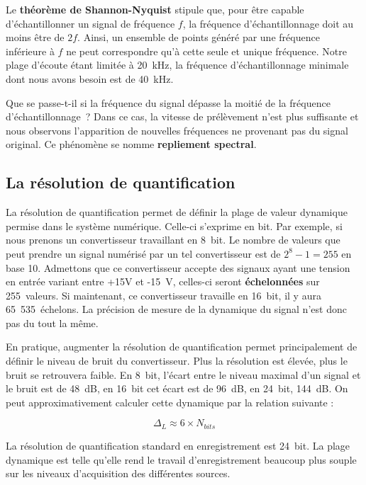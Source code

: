 \documentclass[
]{book}
\begin{document}
Le \textbf{théorème de Shannon-Nyquist} stipule que, pour être capable d'échantillonner un signal de fréquence \(f\), la fréquence d'échantillonnage doit au moins être de \(2f\). Ainsi, un ensemble de points généré par une fréquence inférieure à \(f\) ne peut correspondre qu'à cette seule et unique fréquence. Notre plage d'écoute étant limitée à 20~kHz, la fréquence d'échantillonnage minimale dont nous avons besoin est de 40~kHz.

Que se passe-t-il si la fréquence du signal dépasse la moitié de la fréquence d'échantillonnage~? Dans ce cas, la vitesse de prélèvement n'est plus suffisante et nous observons l'apparition de nouvelles fréquences ne provenant pas du signal original. Ce phénomène se nomme \textbf{repliement spectral}.

\hypertarget{la-ruxe9solution-de-quantification}{%
\subsection{La résolution de quantification}\label{la-ruxe9solution-de-quantification}}

La résolution de quantification permet de définir la plage de valeur dynamique permise dans le système numérique. Celle-ci s'exprime en bit. Par exemple, si nous prenons un convertisseur travaillant en 8~bit. Le nombre de valeurs que peut prendre un signal numérisé par un tel convertisseur est de \(2^8-1 = 255\) en base 10. Admettons que ce convertisseur accepte des signaux ayant une tension en entrée variant entre +15V et -15~V, celles-ci seront \textbf{échelonnées} sur 255~valeurs. Si maintenant, ce convertisseur travaille en 16~bit, il y aura 65~535~échelons. La précision de mesure de la dynamique du signal n'est donc pas du tout la même.

En pratique, augmenter la résolution de quantification permet principalement de définir le niveau de bruit du convertisseur. Plus la résolution est élevée, plus le bruit se retrouvera faible. En 8~bit, l'écart entre le niveau maximal d'un signal et le bruit est de 48~dB, en 16~bit cet écart est de 96~dB, en 24~bit, 144~dB. On peut approximativement calculer cette dynamique par la relation suivante :

\[ \Delta_L \approx 6 \times N_{bits} \]

La résolution de quantification standard en enregistrement est 24~bit. La plage dynamique est telle qu'elle rend le travail d'enregistrement beaucoup plus souple sur les niveaux d'acquisition des différentes sources.
\end{document}
